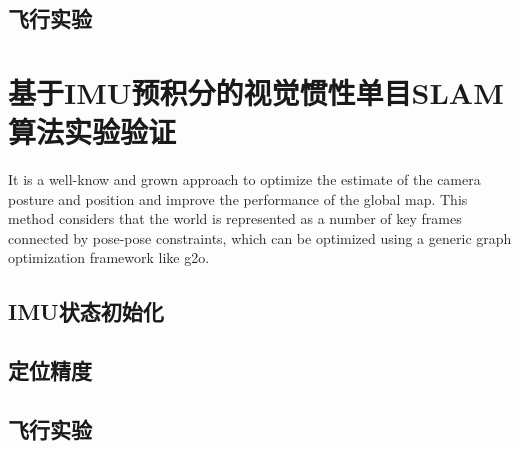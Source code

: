 \subsection{飞行实验}


\section{基于IMU预积分的视觉惯性单目SLAM算法实验验证}

It is a well-know and grown approach to optimize the estimate of the camera posture and position and improve the performance of the global map. This method considers that the world is represented as a number of key frames connected by pose-pose constraints, which can be optimized using a generic graph optimization framework like g2o.

\subsection{IMU状态初始化}

\subsection{定位精度}

\subsection{飞行实验}









